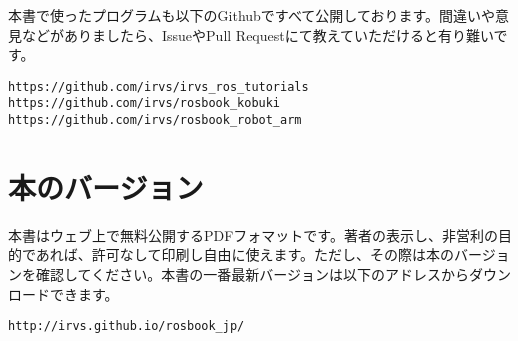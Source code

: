 本書で使ったプログラムも以下のGithubですべて公開しております。間違いや意見などがありましたら、IssueやPull Requestにて教えていただけると有り難いです。

\begin{lstlisting}
https://github.com/irvs/irvs_ros_tutorials
https://github.com/irvs/rosbook_kobuki
https://github.com/irvs/rosbook_robot_arm
\end{lstlisting}

\section*{本のバージョン}

本書はウェブ上で無料公開するPDFフォマットです。著者の表示し、非営利の目的であれば、許可なして印刷し自由に使えます。ただし、その際は本のバージョンを確認してください。本書の一番最新バージョンは以下のアドレスからダウンロードできます。

\begin{lstlisting}
http://irvs.github.io/rosbook_jp/
\end{lstlisting}

